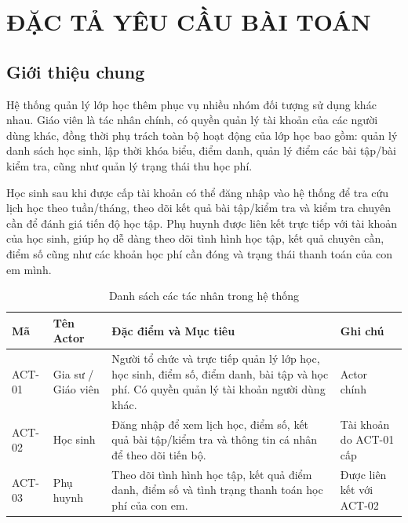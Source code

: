 \chapter{ĐẶC TẢ YÊU CẦU BÀI TOÁN}

\section{Giới thiệu chung}
Hệ thống quản lý lớp học thêm phục vụ nhiều nhóm đối tượng sử dụng khác nhau. Giáo viên là tác nhân chính, có quyền quản lý tài khoản của các người dùng khác, đồng thời phụ trách toàn bộ hoạt động của lớp học bao gồm: quản lý danh sách học sinh, lập thời khóa biểu, điểm danh, quản lý điểm các bài tập/bài kiểm tra, cũng như quản lý trạng thái thu học phí.

Học sinh sau khi được cấp tài khoản có thể đăng nhập vào hệ thống để tra cứu lịch học theo tuần/tháng, theo dõi kết quả bài tập/kiểm tra và kiểm tra chuyên cần để đánh giá tiến độ học tập. Phụ huynh được liên kết trực tiếp với tài khoản của học sinh, giúp họ dễ dàng theo dõi tình hình học tập, kết quả chuyên cần, điểm số cũng như các khoản học phí cần đóng và trạng thái thanh toán của con em mình.

\begin{table}[htbp]
\centering
\caption{Danh sách các tác nhân trong hệ thống}
\begin{tabularx}{\textwidth}{|l|l|X|X|}
\hline
\textbf{Mã} & \textbf{Tên Actor} & \textbf{Đặc điểm và Mục tiêu} & \textbf{Ghi chú} \\ \hline
ACT-01 & Gia sư / Giáo viên & Người tổ chức và trực tiếp quản lý lớp học, học sinh, điểm số, điểm danh, bài tập và học phí. Có quyền quản lý tài khoản người dùng khác. & Actor chính \\ \hline
ACT-02 & Học sinh & Đăng nhập để xem lịch học, điểm số, kết quả bài tập/kiểm tra và thông tin cá nhân để theo dõi tiến bộ. & Tài khoản do ACT-01 cấp \\ \hline
ACT-03 & Phụ huynh & Theo dõi tình hình học tập, kết quả điểm danh, điểm số và tình trạng thanh toán học phí của con em. & Được liên kết với ACT-02 \\ \hline
\end{tabularx}
\end{table}

